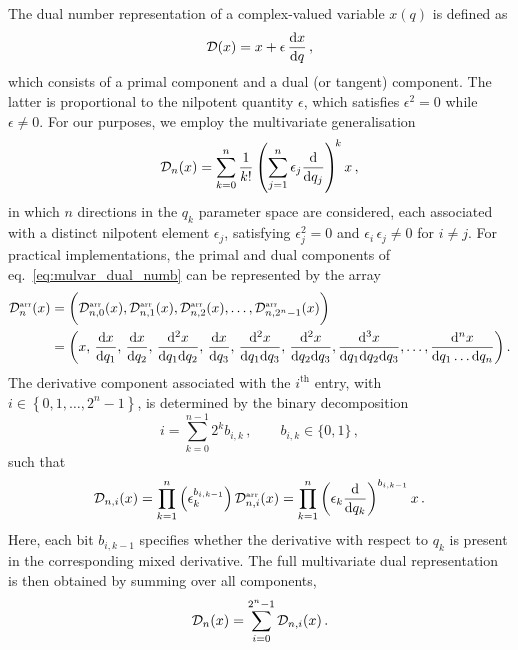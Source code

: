 The dual number representation of a complex-valued variable $x(q)$ is defined as
\begin{equation}
    {\cal D}(x) = x + \epsilon\, \frac{\mathrm{d} x}{\mathrm{d} q}\,,
\end{equation}
which consists of a primal component and a dual (or tangent) component. The latter is proportional to the nilpotent quantity $\epsilon$, which satisfies $\epsilon^2 = 0$ while $\epsilon \neq 0$. For our purposes, we employ the multivariate generalisation
\begin{align}
    {\cal D}_n(x) = \sum_{k=0}^n \frac{1}{k!} \left( \sum_{j=1}^n \epsilon_j \frac{\mathrm{d}}{\mathrm{d} q_j} \right)^{\!k} x\,,
\label{eq:mulvar_dual_numb}
\end{align}
in which $n$ directions in the $q_k$ parameter space are considered, each associated with a distinct nilpotent element $\epsilon_j$, satisfying $\epsilon_j^2 = 0$ and ${\epsilon_i\, \epsilon_j \neq 0}$ for $i \neq j$.
For practical implementations, the primal and dual components of eq.~\eqref{eq:mulvar_dual_numb} can be represented by the array
\begin{align}
    {\cal D}_n^{\scriptscriptstyle{\rm arr}}(x) & = \bigg({\cal D}_{n,0}^{\scriptscriptstyle{\rm arr}}(x),{\cal D}_{n,1}^{\scriptscriptstyle{\rm arr}}(x),{\cal D}_{n,2}^{\scriptscriptstyle{\rm arr}}(x),\ldots,{\cal D}_{n,2^{n}-1}^{\scriptscriptstyle{\rm arr}}(x)\bigg) \nonumber\\
    & = \bigg(
        x,\,
        \frac{\mathrm{d} x}{\mathrm{d} q_1},\,
        \frac{\mathrm{d} x}{\mathrm{d} q_2},\,
        \frac{\mathrm{d}^2 x}{\mathrm{d} q_1\mathrm{d} q_2},\,
        \frac{\mathrm{d} x}{\mathrm{d} q_3},\,
        \frac{\mathrm{d}^2 x}{\mathrm{d} q_1\mathrm{d} q_3},\,
        \frac{\mathrm{d}^2 x}{\mathrm{d} q_2\mathrm{d} q_3}, \frac{\mathrm{d}^3 x}{\mathrm{d} q_1\mathrm{d} q_2\mathrm{d} q_3},
        \dots,
        \frac{\mathrm{d}^n x}{\mathrm{d} q_1\dots\mathrm{d} q_n}
    \bigg)\,.
\label{eq:dual_array}
\end{align}
The derivative component associated with the $i^{\mathrm{th}}$ entry, with $i\in\left\{0,1,\ldots,2^{n}-1\right\}$, is determined by the binary decomposition
\begin{equation}
    i = \sum_{k=0}^{n-1} 2^k b_{i,k}\, , 
    \qquad  
    b_{i,k}\in\{0,1\}\, ,
\label{eq:binary_decomposition}
\end{equation}
such that
\begin{equation}
    {\cal D}_{n,i}(x)  = \prod_{k=1}^{n}\left({\epsilon_k^{b_{i,k-1}}} \right){\cal D}_{n,i}^{\scriptscriptstyle{\rm arr}}(x)= \prod_{k=1}^{n} \left(\epsilon_k \frac{\mathrm{d}}{\mathrm{d} q_k} \right)^{b_{i,k-1}} x\, .
\label{eq:dual_component}
\end{equation}
Here, each bit $b_{i,k-1}$ specifies whether the derivative with respect to $q_{k}$ is present in the corresponding mixed derivative.
The full multivariate dual representation is then obtained by summing over all components,
\begin{equation}
    {\cal D}_n(x) = \sum_{i=0}^{2^n-1} {\cal D}_{n,i}(x)\, .
\end{equation}

